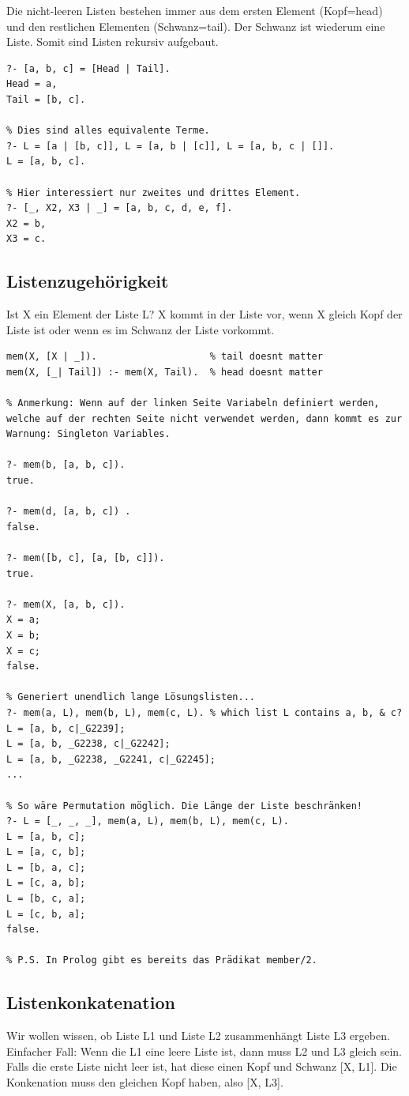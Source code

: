 Die nicht-leeren Listen bestehen immer aus dem ersten Element (Kopf=head) und den restlichen Elementen (Schwanz=tail). Der Schwanz ist wiederum eine Liste. Somit sind Listen rekursiv aufgebaut.

\begin{lstlisting}[caption=Tail-Operator auf Listen]
?- [a, b, c] = [Head | Tail].
Head = a,
Tail = [b, c].

% Dies sind alles equivalente Terme.
?- L = [a | [b, c]], L = [a, b | [c]], L = [a, b, c | []].
L = [a, b, c].

% Hier interessiert nur zweites und drittes Element.
?- [_, X2, X3 | _] = [a, b, c, d, e, f].
X2 = b,
X3 = c.
\end{lstlisting}

\newpage
\subsection{Listenzugehörigkeit}
Ist X ein Element der Liste L? X kommt in der Liste vor, wenn X gleich Kopf der Liste ist oder wenn es im Schwanz der Liste vorkommt. 

\begin{lstlisting}[caption=Listenzugehörigkeit]
mem(X, [X | _]). 					% tail doesnt matter
mem(X, [_| Tail]) :- mem(X, Tail). 	% head doesnt matter

% Anmerkung: Wenn auf der linken Seite Variabeln definiert werden, welche auf der rechten Seite nicht verwendet werden, dann kommt es zur Warnung: Singleton Variables.

?- mem(b, [a, b, c]).
true.

?- mem(d, [a, b, c]) .
false.

?- mem([b, c], [a, [b, c]]).
true.

?- mem(X, [a, b, c]).
X = a;
X = b;
X = c;
false.

% Generiert unendlich lange Lösungslisten...
?- mem(a, L), mem(b, L), mem(c, L). % which list L contains a, b, & c?
L = [a, b, c|_G2239];
L = [a, b, _G2238, c|_G2242];
L = [a, b, _G2238, _G2241, c|_G2245];
...

% So wäre Permutation möglich. Die Länge der Liste beschränken!
?- L = [_, _, _], mem(a, L), mem(b, L), mem(c, L).
L = [a, b, c];
L = [a, c, b];
L = [b, a, c];
L = [c, a, b];
L = [b, c, a];
L = [c, b, a];
false.

% P.S. In Prolog gibt es bereits das Prädikat member/2.
\end{lstlisting}

\newpage
\subsection{Listenkonkatenation}
Wir wollen wissen, ob Liste L1 und Liste L2 zusammenhängt Liste L3 ergeben. Einfacher Fall: Wenn die L1 eine leere Liste ist, dann muss L2 und L3 gleich sein. Falls die erste Liste nicht leer ist, hat diese einen Kopf und Schwanz [X, L1]. Die Konkenation muss den gleichen Kopf haben, also [X, L3].

